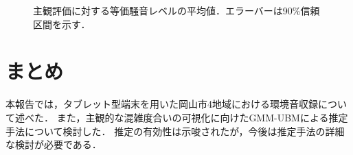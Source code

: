\documentclass[autodetect-engine,dvi=dvipdfmx,ja=standard,
               a4,twoside,10pt]{bxjsarticle}
\begin{document}
\begin{figure}[t]
	\centering
	\hspace{0.05\columnwidth}
	\caption{主観評価に対する等価騒音レベルの平均値．エラーバーは90\%信頼区間を示す．}
	\label{fig:Loudness}
\end{figure}


\section{まとめ}

本報告では，タブレット型端末を用いた岡山市4地域における環境音収録について述べた．
また，主観的な混雑度合いの可視化に向けたGMM-UBMによる推定手法について検討した．
推定の有効性は示唆されたが，今後は推定手法の詳細な検討が必要である．
\end{document}
